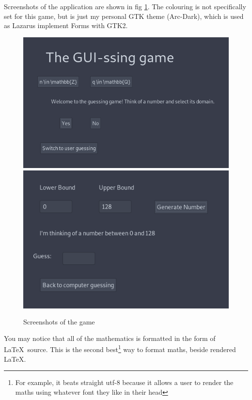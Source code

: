 \documentclass[a4paper,11pt]{article}
\begin{document}
    Screenshots of the application are shown in fig \ref{pic:app}. The colouring
    is not specifically set for this game, but is just my personal GTK theme
    (Arc-Dark), which is used as Lazarus implement Forms with GTK2.

\begin{figure}[H]
\begin{center}
\includegraphics[height=0.2\textheight]{win_screenshot_20180611_202749.png}
\includegraphics[height=0.2\textheight]{win_screenshot_20180611_202757.png}
\end{center}
\caption{Screenshots of the game}\label{pic:app}
\end{figure}

    You may notice that all of the mathematics is formatted in the form of
    \LaTeX\ source. This is the second best\footnote{For example, it beats
    straight utf-8 because it allows a user to render the maths using whatever
    font they like in their head} way to format maths, beside rendered \LaTeX.
\end{document}
